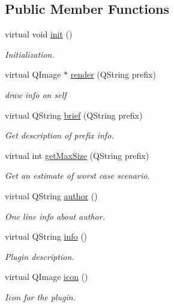\subsection*{\-Public \-Member \-Functions}
\begin{DoxyCompactItemize}
\item 
virtual void \hyperlink{classRenderer_a8a0e8a6de51d4640e5ff760f5fc1b9bc}{init} ()
\begin{DoxyCompactList}\small\item\em \-Initialization. \end{DoxyCompactList}\item 
virtual \-Q\-Image $\ast$ \hyperlink{classRenderer_a13786dda94a49c5f255d6b693b500687}{render} (\-Q\-String prefix)
\begin{DoxyCompactList}\small\item\em draw info on self \end{DoxyCompactList}\item 
virtual \-Q\-String \hyperlink{classRenderer_a6a57c2e7dfa9ae4ad272a6f61234c5b3}{brief} (\-Q\-String prefix)
\begin{DoxyCompactList}\small\item\em \-Get description of prefix info. \end{DoxyCompactList}\item 
virtual int \hyperlink{classRenderer_a479c62b6f7349983bfe8d878f81ac3ea}{get\-Max\-Size} (\-Q\-String prefix)
\begin{DoxyCompactList}\small\item\em \-Get an estimate of worst case scenario. \end{DoxyCompactList}\item 
virtual \-Q\-String \hyperlink{classRenderer_a41eb4d0d51f89814b0e31b1008c40c10}{author} ()
\begin{DoxyCompactList}\small\item\em \-One line info about author. \end{DoxyCompactList}\item 
\hypertarget{classRenderer_a9cb0bfa4fe0dd943c18b642d7f530e56}{
virtual \-Q\-String \hyperlink{classRenderer_a9cb0bfa4fe0dd943c18b642d7f530e56}{info} ()}
\label{classRenderer_a9cb0bfa4fe0dd943c18b642d7f530e56}

\begin{DoxyCompactList}\small\item\em \-Plugin description. \end{DoxyCompactList}\item 
virtual \-Q\-Image \hyperlink{classRenderer_a33e7b24d62656bbe483ff6c092cc0298}{icon} ()
\begin{DoxyCompactList}\small\item\em \-Icon for the plugin. \end{DoxyCompactList}\end{DoxyCompactItemize}


